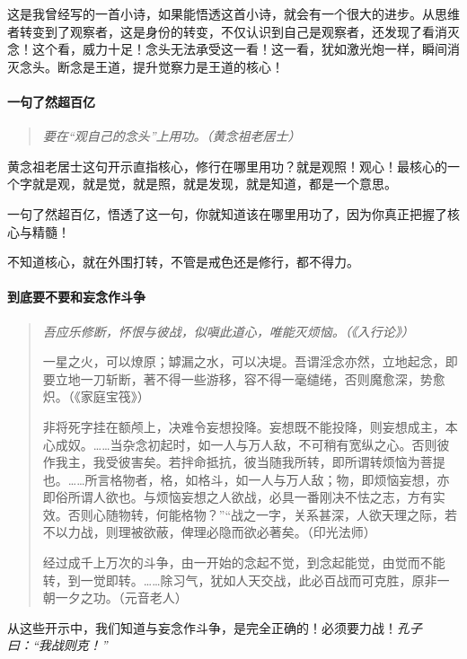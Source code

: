 这是我曾经写的一首小诗，如果能悟透这首小诗，就会有一个很大的进步。从思维者转变到了观察者，这是身份的转变，不仅认识到自己是观察者，还发现了看消灭念！这个看，威力十足！念头无法承受这一看！这一看，犹如激光炮一样，瞬间消灭念头。断念是王道，提升觉察力是王道的核心！

\paragraph{一句了然超百亿}

\begin{quote}\it
    要在“观自己的念头”上用功。（黄念祖老居士）
\end{quote}

黄念祖老居士这句开示直指核心，修行在哪里用功？就是观照！观心！最核心的一个字就是观，就是觉，就是照，就是发现，就是知道，都是一个意思。

一句了然超百亿，悟透了这一句，你就知道该在哪里用功了，因为你真正把握了核心与精髓！

不知道核心，就在外围打转，不管是戒色还是修行，都不得力。

\paragraph{到底要不要和妄念作斗争}

\begin{quotation}\it
    吾应乐修断，怀恨与彼战，似嗔此道心，唯能灭烦恼。（《入行论》）

    一星之火，可以燎原；罅漏之水，可以决堤。吾谓淫念亦然，立地起念，即要立地一刀斩断，著不得一些游移，容不得一毫缱绻，否则魔愈深，势愈炽。（《家庭宝筏》）

    非将死字挂在额颅上，决难令妄想投降。妄想既不能投降，则妄想成主，本心成奴。……当杂念初起时，如一人与万人敌，不可稍有宽纵之心。否则彼作我主，我受彼害矣。若拌命抵抗，彼当随我所转，即所谓转烦恼为菩提也。……所言格物者，格，如格斗，如一人与万人敌；物，即烦恼妄想，亦即俗所谓人欲也。与烦恼妄想之人欲战，必具一番刚决不怯之志，方有实效。否则心随物转，何能格物？”“战之一字，关系甚深，人欲天理之际，若不以力战，则理被欲蔽，俾理必隐而欲必著矣。（印光法师）

    经过成千上万次的斗争，由一开始的念起不觉，到念起能觉，由觉而不能转，到一觉即转。……除习气，犹如人天交战，此必百战而可克胜，原非一朝一夕之功。（元音老人）
\end{quotation}

从这些开示中，我们知道与妄念作斗争，是完全正确的！必须要力战！\textit{孔子曰：“我战则克！”}

